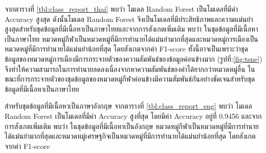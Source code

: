 \documentclass[12pt,oneside,openright,a4paper]{cpe-thai-project}
\begin{document}
      \hspace{1cm}จากตารางที่ \ref{tbl:class_report_thai} พบว่า โมเดล Random Forest เป็นโมเดลที่มีค่า Accuracy สูงสุด ดังนั้นโมเดล Random Forest
      จึงเป็นโมเดลที่มีประสิทธิภาพและความแม่นยำสูงสุดสำหรับชุดข้อมูลที่มีเนื้อหาเป็นภาษาไทยและจากการสังเกตเพิ่มเติม พบว่า ในชุดข้อมูลที่มีเนื้อหาเป็นภาษาไทย
      หมวดหมู่กีฬาเป็นหมวดหมู่ที่มีการทำนายได้แม่นยำมากที่สุดและหมวดหมู่การเมืองเป็นหมวดหมู่ที่มีการทำนายได้แม่นยำน้อยที่สุด โดยสังเกตจากค่า F1-score
      ทั้งนี้อาจเป็นเพราะว่าชุดข้อมูลของหมวดหมู่การเมืองมีการกระจายตัวของความสัมพันธ์ของข้อมูลค่อนข้างมาก (รูปที่:\ref{fig:tsne}) 
      จึงทำให้ความสามารถในการทำนายลดลงเนื่องจากหาความสัมพันธ์ของคำได้ยากกว่าหมวดหมู่อื่น 
      ในขณะที่การกระจายตัวของชุดข้อมูลของหมวดหมู่กีฬาค่อนข้างมีความสัมพันธ์กันอย่างชัดเจนสำหรับชุดข้อมูลที่มีเนื้อหาเป็นภาษาไทย 

      \hspace{1cm}สำหรับชุดข้อมูลที่มีเนื้อหาเป็นภาษาอังกฤษ จากตารางที่ \ref{tbl:class_report_eng} พบว่า โมเดล Random Forest 
      เป็นโมเดลที่มีค่า Accuracy สูงที่สุด โดยมีค่า Accuracy อยู่ที่ 0.9456 และจากการสังเกตเพิ่มเติม พบว่า ในชุดข้อมูลที่มีเนื้อหาเป็นอังกฤษ
      หมวดหมู่กีฬาเป็นหมวดหมู่ที่มีการทำนายได้แม่นยำมากที่สุดและหมวดหมู่เศรษฐกิจเป็นหมวดหมู่ที่มีการทำนายได้แม่นยำน้อยที่สุด โดยสังเกตจากค่า F1-score
      
\end{document}
